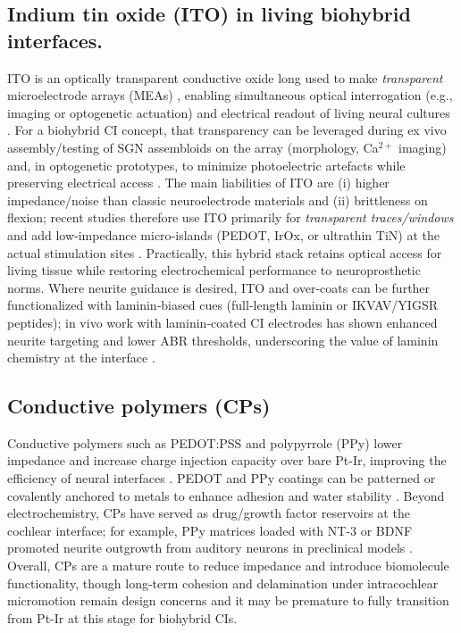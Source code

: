 \documentclass[referee,pdflatex, sn-vancouver-num]{sn-jnl}%
\theoremstyle{thmstyleone}%
\theoremstyle{thmstyletwo}%
\theoremstyle{thmstylethree}%
\begin{document}
\subsection{Indium tin oxide (ITO) in living biohybrid interfaces.}
ITO is an optically transparent conductive oxide long used to make \emph{transparent} microelectrode arrays (MEAs) \cite{Weaver2022_JNE_TransparentMEA}, enabling simultaneous optical interrogation (e.g., imaging or optogenetic actuation) and electrical readout of living neural cultures \citep{Gross1985ITO,Weaver2022TransparentMEA,Kunori2015ITOEpidural}. For a biohybrid CI concept, that transparency can be leveraged during ex vivo assembly/testing of SGN assembloids on the array (morphology, Ca$^{2+}$ imaging) and, in optogenetic prototypes, to minimize photoelectric artefacts while preserving electrical access \citep{Cho2022TransparentImplants, Kunori2015ITOEpidural}. The main liabilities of ITO are (i) higher impedance/noise than classic neuroelectrode materials and (ii) brittleness on flexion; recent studies therefore use ITO primarily for \emph{transparent traces/windows} and add low‑impedance micro‑islands (PEDOT, IrOx, or ultrathin TiN) at the actual stimulation sites \citep{Ryynanen2019ALDTiN,Ryynanen2020IBAD}. Practically, this hybrid stack retains optical access for living tissue while restoring electrochemical performance to neuroprosthetic norms. Where neurite guidance is desired, ITO and over‑coats can be further functionalized with laminin‑biased cues (full‑length laminin or IKVAV/YIGSR peptides); in vivo work with laminin‑coated CI electrodes has shown enhanced neurite targeting and lower ABR thresholds, underscoring the value of laminin chemistry at the interface \citep{Bas2019LamininCI,Parys2022InnerEarTherapy}.

\subsection{Conductive polymers (CPs)}
Conductive polymers such as PEDOT:PSS and polypyrrole (PPy) lower impedance and increase charge injection capacity over bare Pt-Ir, improving the efficiency of neural interfaces \cite{Venkatraman2011-ql,Jow2023_APLBioeng_PEDOTPt}. PEDOT and PPy coatings can be patterned or covalently anchored to metals to enhance adhesion and water stability \cite{Kleber2017,Chhin2018,Chen2024_NatRevBioeng}. Beyond electrochemistry, CPs have served as drug/growth factor reservoirs at the cochlear interface; for example, PPy matrices loaded with NT-3 or BDNF promoted neurite outgrowth from auditory neurons in preclinical models \cite{Richardson2007,Richardson2009,Evans2009-cm}. Overall, CPs are a mature route to reduce impedance and introduce biomolecule functionality, though long-term cohesion and delamination under intracochlear micromotion remain design concerns \cite{li2025pedot} and it may be premature to fully transition from Pt-Ir at this stage for biohybrid CIs. 
\end{document}
